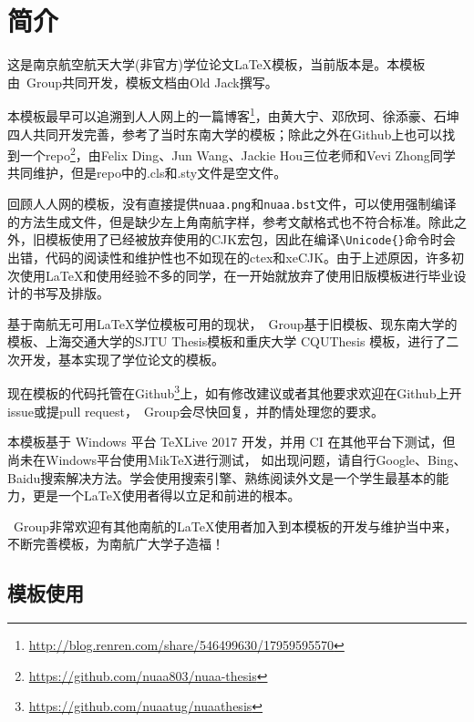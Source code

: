 \chapter{简介}\label{chap:intro}

这是南京航空航天大学(非官方)学位论文\LaTeX 模板，当前版本是\version。本模板由\nuaathesis~Group共同开发，模板文档由Old Jack撰写。

本模板最早可以追溯到人人网上的一篇博客\footnote{\url{http://blog.renren.com/share/546499630/17959595570}}，由黄大宁、邓欣珂、徐添豪、石坤四人共同开发完善，参考了当时东南大学的\seuthesix 模板；除此之外在Github上也可以找到一个repo\footnote{\url{https://github.com/nuaa803/nuaa-thesis}}，由Felix Ding、Jun Wang、Jackie Hou三位老师和Vevi Zhong同学共同维护，但是repo中的.cls和.sty文件是空文件。

回顾人人网的模板，没有直接提供\verb|nuaa.png|和\verb|nuaa.bst|文件，可以使用强制编译的方法生成文件，但是缺少左上角南航字样，参考文献格式也不符合标准。除此之外，旧模板使用了已经被放弃使用的CJK宏包，因此在编译\verb+\Unicode{}+命令时会出错，代码的阅读性和维护性也不如现在的ctex和xeCJK。由于上述原因，许多初次使用\LaTeX 和使用经验不多的同学，在一开始就放弃了使用旧版模板进行毕业设计的书写及排版。

基于南航无可用\LaTeX 学位模板可用的现状，\nuaathesis~Group基于旧\oldnuaathesis 模板、现东南大学的\seuthesix 模板、上海交通大学的SJTU Thesis模板和重庆大学 CQUThesis 模板，进行了二次开发，基本实现了学位论文的模板。

现在\nuaathesis 模板的代码托管在Github\footnote{\url{https://github.com/nuaatug/nuaathesis}}上，如有修改建议或者其他要求欢迎在Github上开issue或提pull request，\nuaathesis~Group会尽快回复，并酌情处理您的要求。

本模板基于 Windows 平台 \TeX Live 2017 开发，并用 CI 在其他平台下测试，但尚未在Windows平台使用Mik\TeX 进行测试，
如出现问题，请自行Google、Bing、Baidu搜索解决方法。学会使用搜索引擎、熟练阅读外文是一个学生最基本的能力，更是一个\LaTeX 使用者得以立足和前进的根本。

\nuaathesis~Group非常欢迎有其他南航的\LaTeX 使用者加入到本模板的开发与维护当中来，不断完善模板，为南航广大学子造福！

\section{模板使用}
